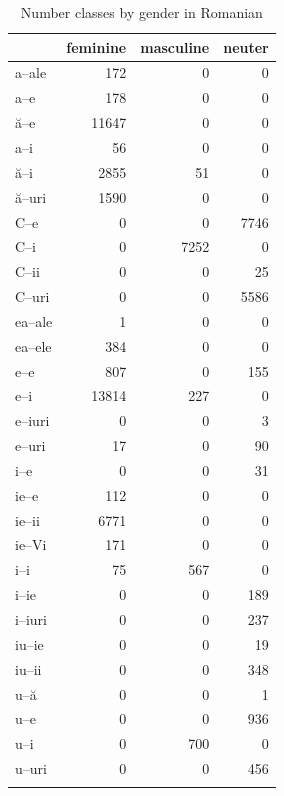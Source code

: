 \begin{table}[p]
  \centering
  \begin{tabular}{lrrr}
    \lsptoprule
           & feminine & masculine & neuter \\
    \midrule
    a--ale  & 172      & 0         & 0      \\
    a--e    & 178      & 0         & 0      \\
    ă--e    & 11647    & 0         & 0      \\
    a--i    & 56       & 0         & 0      \\
    ă--i    & 2855     & 51        & 0      \\
    ă--uri  & 1590     & 0         & 0      \\
    C--e    & 0        & 0         & 7746   \\
    C--i    & 0        & 7252      & 0      \\
    C--ii   & 0        & 0         & 25     \\
    C--uri  & 0        & 0         & 5586   \\
    ea--ale & 1        & 0         & 0      \\
    ea--ele & 384      & 0         & 0      \\
    e--e    & 807      & 0         & 155    \\
    e--i    & 13814    & 227       & 0      \\
    e--iuri & 0        & 0         & 3      \\
    e--uri  & 17       & 0         & 90     \\
    i--e    & 0        & 0         & 31     \\
    ie--e   & 112      & 0         & 0      \\
    ie--ii  & 6771     & 0         & 0      \\
    ie--Vi  & 171      & 0         & 0      \\
    i--i    & 75       & 567       & 0      \\
    i--ie   & 0        & 0         & 189    \\
    i--iuri & 0        & 0         & 237    \\
    iu--ie  & 0        & 0         & 19     \\
    iu--ii  & 0        & 0         & 348    \\
    u--ă    & 0        & 0         & 1      \\
    u--e    & 0        & 0         & 936    \\
    u--i    & 0        & 700       & 0      \\
    u--uri  & 0        & 0         & 456    \\
    \lspbottomrule
  \end{tabular}
\caption{Number classes by gender in Romanian}\label{tab:decl-rom-gender}
\end{table}

